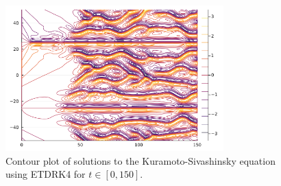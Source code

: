 \documentclass[12pt]{report}
\begin{document}
\begin{solution}
     \begin{figure}[H]
        \centering
        \includegraphics[width=0.75\textwidth,height=\textwidth,keepaspectratio]{images/4.png}
        \caption{Contour plot of solutions to the Kuramoto-Sivashinsky equation using ETDRK4 for $t\in[0,150]$.}
        \label{fig4}
     \end{figure}

\end{solution}

\end{document}
